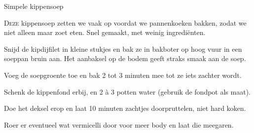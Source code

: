 \begin{recipe}{Simpele kippensoep}
\label{recipe:kippensoep-simpel}


\lettrine{D}{eze} kippensoep zetten we vaak op voordat we pannenkoeken bakken, zodat we
niet alleen maar zoet eten. Snel gemaakt, met weinig ingrediënten.

\begin{ingredients}
\end{ingredients}

\begin{steps}
  \item Snijd de kipdijfilet in kleine stukjes en bak ze in bakboter op hoog vuur
        in een soeppan bruin aan. Het aanbaksel op de bodem geeft straks smaak aan
        de soep.
  \item Voeg de soepgroente toe en bak 2 tot 3 minuten mee tot ze iets
        zachter wordt.
  \item Schenk de kippenfond erbij, en 2 à 3 potten water (gebruik de fondpot als
        maat).
  \item Doe het deksel erop en laat 10 minuten zachtjes doorpruttelen, niet hard
        koken.
  \item Roer er eventueel wat vermicelli door voor meer body en laat die
        meegaren.
\end{steps}
\end{recipe}
